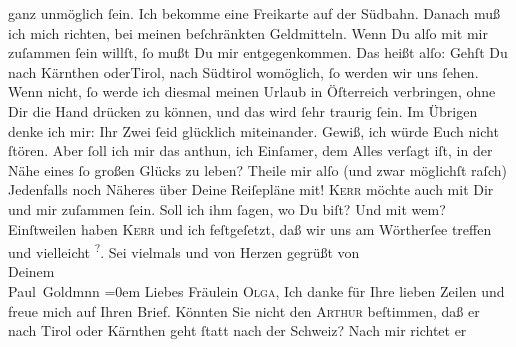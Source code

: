 \begin{ledgroupsized}[t]{13cm}
               ganz unmöglich ſein. Ich bekomme eine Freikarte auf der Südbahn. Danach muß ich mich richten, bei meinen beſchränkten
               Geldmitteln. Wenn Du alſo mit mir {\pb}zuſammen ſein
               willſt, ſo mußt Du mir entgegenkommen. Das heißt alſo: Gehſt Du nach \introOben{}Kärnthen oder\introOben{}{ }Tirol, nach Südtirol womöglich, ſo werden wir uns ſehen. Wenn  nicht, ſo werde ich diesmal meinen Urlaub in Öſterreich verbringen, ohne Dir die Hand drücken zu können, und das wird
               ſehr traurig ſein. Im Übrigen denke ich mir: Ihr Zwei ſeid glücklich miteinander.
               Gewiß, ich würde Euch nicht ſtören. Aber ſoll ich mir das anthun, ich Einſamer, {\pb}dem Alles verſagt iſt, in der Nähe eines ſo großen
               Glücks zu leben?\pend
           \pstart
           Theile mir alſo \introOben{}(und zwar möglichſt raſch)\introOben{}{ } Jedenfalls noch Näheres über Deine Reiſepläne mit! \textsc{Kerr} möchte auch mit Dir und mir zuſammen ſein. Soll ich ihm ſagen, wo Du biſt? Und
               mit wem? Einſtweilen haben \textsc{Kerr} und ich feſtgeſetzt, daß wir uns am Wörtherſee treffen und vielleicht \label{K_L03071-7v}\label{K_L03071-7h}\substVorne{}\textsuperscript{?}\substDazwischen{}.\substHinten{}\pend
           \pstart
           {\pb}Sei vielmals und von Herzen gegrüßt von {\\[\baselineskip]}Deinem {\\[\baselineskip]}\spacefill\mbox{Paul Goldmnn}\pend
           \leftskip=0em{}{\bigskip}\pstart
           \noindent{}Liebes Fräulein \textsc{Olga}, Ich
               danke für Ihre lieben Zeilen und freue mich auf Ihren Brief. Könnten Sie nicht den
                  \textsc{Arthur} beſtimmen, daß er nach Tirol oder Kärnthen geht
               ſtatt nach der Schweiz? Nach mir richtet er

\end{ledgroupsized}
